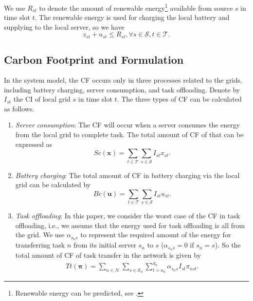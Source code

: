 \documentclass[conference, 10pt, ﬁnal, letterpaper, twocolumn]{IEEEtran}
\begin{document}
We use $R_{st}$ to denote the amount of renewable energy\footnote{Renewable energy can be predicted, see \cite{li2019renewable}.} available from source $s$ in time slot $t$. The renewable energy is used for charging the local battery and supplying to the local server, so we have  
\begin{equation}\label{c5}
    z_{st} + u_{st} \leq R_{st}, \forall s \in \mathcal{S}, t \in \mathcal{T}.
\end{equation}

\subsection{Carbon Footprint and Formulation} \label{subsec:CFA}

In the system model, the CF occurs only in three processes related to the grids, including battery charging, server consumption, and task offloading. Denote by $I_{st}$ the CI of local grid $s$ in time slot $t$. The three types of CF can be calculated as follows.
\begin{enumerate}
    \item {\em Server consumption}: The CF will occur when a server consumes the energy from the local grid to complete task. The total amount of CF of that can be expressed as
    \begin{equation}\label{th}
        Sc(\boldsymbol{x}) = \sum_{t \in \mathcal{T}} \sum_{s\in \mathcal{S}} I_{st}x_{st}.
    \end{equation}
    \item {\em Battery charging}: The total amount of CF in battery charging via the local grid can be calculated by
    \begin{equation}\label{bc}
        Bc(\boldsymbol{u}) = \sum_{t \in \mathcal{T}} \sum_{s\in \mathcal{S}} I_{st}u_{st}.
    \end{equation}
    \item {\em Task offloading}: In this paper, we consider the worst case of the CF in task offloading, i.e., we assume that the energy used for task offloading is all from the grid. We use $\alpha_{s_n s}$ to represent the required amount of the energy for transferring task $n$ from its initial server $s_n$ to $s$ ($\alpha_{s_n s} = 0$ if $s_n = s$). So the total amount of CF of task transfer in the network is given by
    \begin{align}\label{tt}
        Tt(\boldsymbol{\pi}) =  \sum_{n \in \mathcal{N}} \sum_{s \in \mathcal{S}_n}  \sum^{d_n}_{t = o_n} \alpha_{s_n s} I_{st}  \pi_{nst}.
    \end{align}
\end{enumerate}
\end{document}
